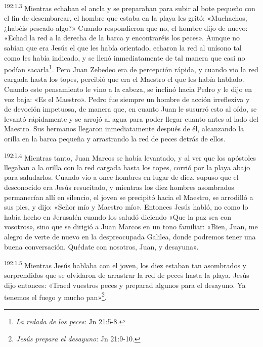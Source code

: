 \par 
\textsuperscript{192:1.3} Mientras echaban el ancla y se preparaban para subir al bote pequeño con el fin de desembarcar, el hombre que estaba en la playa les gritó: «Muchachos, ¿habéis pescado algo?» Cuando respondieron que no, el hombre dijo de nuevo: «Echad la red a la derecha de la barca y encontraréis los peces». Aunque no sabían que era Jesús el que les había orientado, echaron la red al unísono tal como les había indicado, y se llenó inmediatamente de tal manera que casi no podían sacarla\footnote{\textit{La redada de los peces}: Jn 21:5-8.}. Pero Juan Zebedeo era de percepción rápida, y cuando vio la red cargada hasta los topes, percibió que era el Maestro el que les había hablado. Cuando este pensamiento le vino a la cabeza, se inclinó hacia Pedro y le dijo en voz baja: «Es el Maestro». Pedro fue siempre un hombre de acción irreflexiva y de devoción impetuosa, de manera que, en cuanto Juan le susurró esto al oído, se levantó rápidamente y se arrojó al agua para poder llegar cuanto antes al lado del Maestro. Sus hermanos llegaron inmediatamente después de él, alcanzando la orilla en la barca pequeña y arrastrando la red de peces detrás de ellos.

\par 
\textsuperscript{192:1.4} Mientras tanto, Juan Marcos se había levantado, y al ver que los apóstoles llegaban a la orilla con la red cargada hasta los topes, corrió por la playa abajo para saludarlos. Cuando vio a once hombres en lugar de diez, supuso que el desconocido era Jesús resucitado, y mientras los diez hombres asombrados permanecían allí en silencio, el joven se precipitó hacia el Maestro, se arrodilló a sus pies, y dijo: «Señor mío y Maestro mío». Entonces Jesús habló, no como lo había hecho en Jerusalén cuando los saludó diciendo «Que la paz sea con vosotros», sino que se dirigió a Juan Marcos en un tono familiar: «Bien, Juan, me alegro de verte de nuevo en la despreocupada Galilea, donde podremos tener una buena conversación. Quédate con nosotros, Juan, y desayuna».

\par 
\textsuperscript{192:1.5} Mientras Jesús hablaba con el joven, los diez estaban tan asombrados y sorprendidos que se olvidaron de arrastrar la red de peces hasta la playa. Jesús dijo entonces: «Traed vuestros peces y preparad algunos para el desayuno. Ya tenemos el fuego y mucho pan»\footnote{\textit{Jesús prepara el desayuno}: Jn 21:9-10.}.

